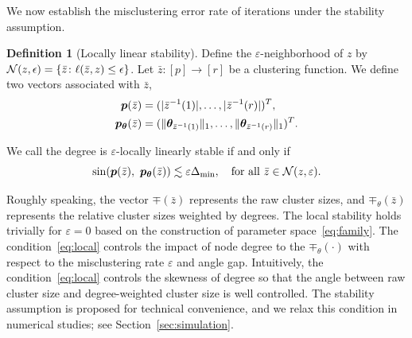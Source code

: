 \documentclass[journal]{IEEEtran}
\theoremstyle{definition}
\theoremstyle{definition}
\newtheorem{defn}{Definition}
\begin{document}
We now establish the misclustering error rate of iterations under the stability assumption. 
\begin{defn}[Locally linear stability] \label{def:stable}
Define the $\varepsilon$-neighborhood of $z$ by $\mathcal{N}(z,\epsilon)=\{\bar z\colon \ell(\bar z, z)\leq \epsilon\}$. Let $\bar z\colon[p]\to [r]$ be a clustering function. We define two vectors associated with $\bar z$,
\begin{align}
    \bm{p}(\bar z) & =(|\bar z^{-1}(1)|, \ldots,|\bar z^{-1}(r)|)^T, \\
    \bm{p}_{\boldsymbol{\theta}}(\bar z)&=(\lVert\boldsymbol{\theta}_{\bar z^{-1}(1)}\rVert_1,\ldots,\lVert\boldsymbol{\theta}_{\bar z^{-1}(r)}\rVert_1)^T.
\end{align}

We call the degree is $\varepsilon$-locally linearly stable if and only if 
\begin{equation}\label{eq:local}
    \sin(\mp(\bar z),\ \mp_{\mtheta}(\bar z))\lesssim \varepsilon \Delta_{\min} ,\quad \text{for all } \bar z\in \tN(z, \varepsilon).
\end{equation}
\end{defn}

Roughly speaking, the vector $\mp(\bar z)$ represents the raw cluster sizes, and $\mp_{\theta}(\bar z)$ represents the relative cluster sizes weighted by degrees. 
The local stability holds trivially for $\varepsilon=0$ based on the construction of parameter space~\eqref{eq:family}. The condition~\eqref{eq:local} controls the impact of node degree to the $\mp_{\theta}(\cdot)$ with respect to the misclustering rate $\varepsilon$ and angle gap.  Intuitively, the condition~\eqref{eq:local} controls the skewness of degree so that the angle between raw cluster size and degree-weighted cluster size is well controlled. The stability assumption is proposed for technical convenience, and we relax this condition in numerical studies; see Section~\ref{sec:simulation}.
\end{document}
